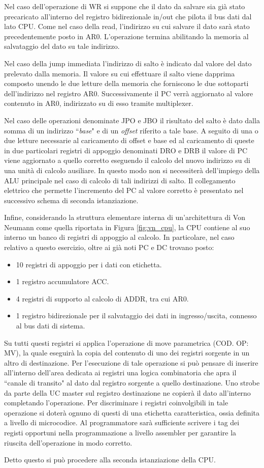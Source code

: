 Nel caso dell'operazione di WR si suppone che il dato da salvare sia già stato precaricato all'interno del registro bidirezionale in/out che pilota il bus dati dal lato CPU. Come nel caso della read, l'indirizzo su cui salvare il dato sarà stato precedentemente posto in AR0. L'operazione termina abilitando la memoria al salvataggio del dato su tale indirizzo.
\par \bigskip \noindent
Nel caso della jump immediata l'indirizzo di salto è indicato dal valore del dato prelevato dalla memoria. Il valore su cui effettuare il salto viene dapprima composto unendo le due letture della memoria che forniscono le due sottoparti dell'indirizzo nel registro AR0. Successivamente il PC verrà aggiornato al valore contenuto in AR0, indirizzato su di esso tramite multiplexer.
\par \bigskip \noindent
Nel caso delle operazioni denominate JPO e JBO il risultato del salto è dato dalla somma di un indirizzo \textquotedblleft \textit{base}" e di un \textit{offset} riferito a tale base. A seguito di una o due letture necessarie al caricamento di offset e base ed al caricamento di queste in due particolari registri di appoggio denominati DRO e DRB il valore di PC viene aggiornato a quello corretto eseguendo il calcolo del nuovo indirizzo su di una unità di calcolo ausiliare. In questo modo non si necessiterà dell'impiego della ALU principale nel caso di calcolo di tali indirizzi di salto. Il collegamento elettrico che permette l'incremento del PC al valore corretto è presentato nel successivo schema di seconda istanziazione.
\par \bigskip \noindent
Infine, considerando la struttura elementare interna di un'architettura di Von Neumann come quella riportata in Figura \ref{fig:vn_cpu}, la CPU contiene al suo interno un banco di registri di appoggio al calcolo. In particolare, nel caso relativo a questo esercizio, oltre ai già noti PC e DC trovano posto:
\begin{itemize}
	\item 10 registri di appoggio per i dati con etichetta.
	\item 1 registro accumulatore ACC.
	\item 4 registri di supporto al calcolo di ADDR, tra cui AR0.
	\item 1 registro bidirezionale per il salvataggio dei dati in ingresso/uscita, connesso al bus dati di sistema.
\end{itemize}
Su tutti questi registri si applica l'operazione di move parametrica (COD. OP: MV), la quale eseguirà la copia del contenuto di uno dei registri sorgente in un altro di destinazione. Per l'esecuzione di tale operazione si può pensare di inserire all'interno dell'area dedicata ai registri una logica combinatoria che apra il \textquotedblleft canale di transito" al dato dal registro sorgente a quello destinazione. Uno strobe da parte della UC master sul registro destinazione ne copierà il dato all'interno completando l'operazione. Per discriminare i registri coinvolgibili in tale operazione si doterà ognuno di questi di una etichetta caratteristica, ossia definita a livello di microcodice. Al programmatore sarà sufficiente scrivere i tag dei registi opportuni nella programmazione a livello assembler per garantire la riuscita dell'operazione in modo corretto.
\par \bigskip \noindent
Detto questo si può procedere alla seconda istanziazione della CPU.